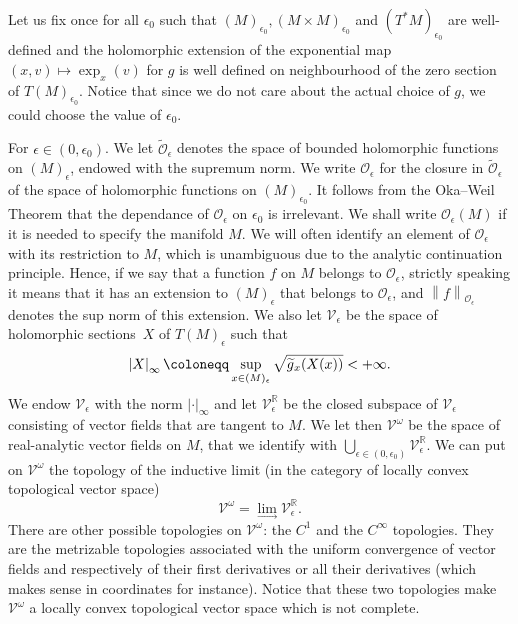 \documentclass[AHL,Unicode,longabstracts,published]{cedram}
\newcommand{\n}[1]{\left\|#1\right\|}
\newcommand{\va}[1]{\left|#1\right|}
\newcommand{\clO}{\mathcal{O}}
\newcommand{\clV}{\mathcal{V}}
\newcommand{\bbR}{\mathbb{R}}
\let\oldtilde\tilde
\renewcommand*{\tilde}[1]{\mathchoice{\widetilde{#1}}{\widetilde{#1}}{\oldtilde{#1}}{\oldtilde{#1}}}
\newcommand{\clO}{\mathcal{O}}
\begin{document}
Let us fix once for all $\epsilon_0$ such that $(M)_{\epsilon_0}, (M \times M)_{\epsilon_0}$ and $(T^* M)_{\epsilon_0}$ are well-defined and the holomorphic extension of the exponential map $(x,v) \mapsto \exp_x(v)$ for $g$ is well defined on neighbourhood of the zero section of $T(M)_{\epsilon_0}$. Notice that since we do not care about the actual choice of $g$, we could choose the value of $\epsilon_0$.

For $\epsilon \in (0,\epsilon_0)$. We let $\widetilde{\clO}_\epsilon$ denotes the space of bounded holomorphic functions on $(M)_\epsilon$, endowed with the supremum norm. We write $\clO_\epsilon$ for the closure in $\widetilde{\clO}_\epsilon$ of the space of holomorphic functions on $(M)_{\epsilon_0}$. It follows from the Oka--Weil Theorem that the dependance of $\clO_\epsilon$ on $\epsilon_0$ is irrelevant. We shall write $\clO_\epsilon(M)$ if it is needed to specify the manifold $M$. We will often identify an element of $\clO_\epsilon$ with its restriction to $M$, which is unambiguous due to the analytic continuation principle. Hence, if we say that a function $f$ on $M$ belongs to $\clO_\epsilon$, strictly speaking it means that it has an extension to $(M)_\epsilon$ that belongs to $\clO_\epsilon$, and $\n{f}_{\clO_\epsilon}$ denotes the sup norm of this extension. We also let $\clV_\epsilon$ be the space of holomorphic sections~$X$ of $T (M)_\epsilon$ such that
\begin{equation*}
\va{X}_\infty \coloneqq \sup_{x \in (M)_\epsilon} \sqrt{\tilde{g}_x(X(x))} < + \infty.
\end{equation*}
We endow $\clV_\epsilon$ with the norm $\va{\cdot}_\infty$ and let $\clV_\epsilon^{\bbR}$ be the closed subspace of $\clV_\epsilon$ consisting of vector fields that are tangent to $M$. We let then $\clV^\omega$ be the space of real-analytic vector fields on $M$, that we identify with $\bigcup_{\epsilon \in (0,\epsilon_0)} \clV_\epsilon^{\bbR}$. We can put on $\clV^\omega$ the topology of the inductive limit (in the category of locally convex topological vector space)
\begin{equation*}
\clV^\omega = \lim_{\to} \clV_\epsilon^{\bbR}.
\end{equation*}
There are other possible topologies on $\clV^\omega$: the $C^1$ and the $C^\infty$ topologies. They are the metrizable topologies associated with the uniform convergence of vector fields and respectively of their first derivatives or all their derivatives (which makes sense in coordinates for instance). Notice that these two topologies make $\clV^\omega$ a locally convex topological vector space which is not complete.
\end{document}
